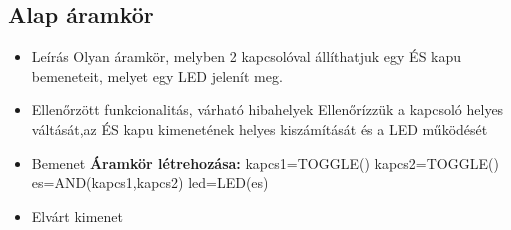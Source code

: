 \subsection{Alap áramkör}
\begin{itemize}
\item Leírás\newline
Olyan áramkör, melyben 2 kapcsolóval állíthatjuk egy ÉS kapu bemeneteit, melyet egy LED jelenít meg.
\item Ellenőrzött funkcionalitás, várható hibahelyek\newline
Ellenőrízzük a kapcsoló helyes váltását,az ÉS kapu kimenetének helyes kiszámítását és a LED működését
\item Bemenet\newline
\newline
{\bf Áramkör létrehozása:}\newline
kapcs1=TOGGLE()\newline
kapcs2=TOGGLE()\newline
es=AND(kapcs1,kapcs2)\newline
led=LED(es)\newline
\item Elvárt kimenet\newline
{}
\end{itemize}

